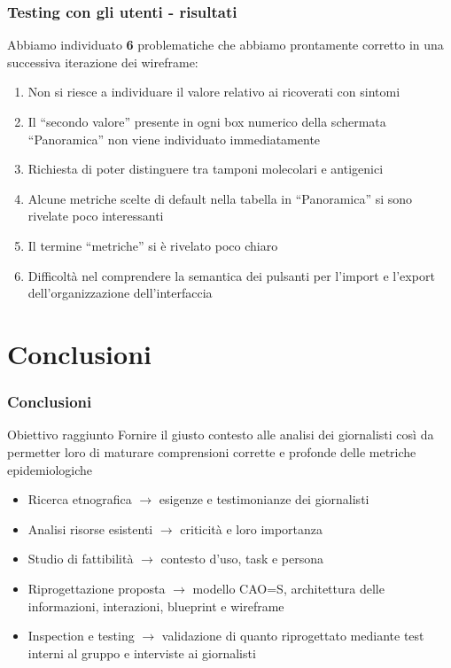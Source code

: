 \documentclass[handout]{beamer}
\begin{document}
		\begin{frame}
			\frametitle{Testing con gli utenti - risultati}
			Abbiamo individuato \textbf{6} problematiche che abbiamo prontamente corretto in una successiva iterazione dei wireframe:
			\begin{enumerate}[<+->]
				\item Non si riesce a individuare il valore relativo ai ricoverati con sintomi\\
				\item Il ``secondo valore'' presente in ogni box numerico della schermata ``Panoramica'' non viene individuato immediatamente\\
				\item Richiesta di poter distinguere tra tamponi molecolari e antigenici\\
				\item Alcune metriche scelte di default nella tabella in ``Panoramica'' si sono rivelate poco interessanti\\
				\item Il termine ``metriche'' si è rivelato poco chiaro\\
				\item Difficoltà nel comprendere la semantica dei pulsanti per l'import e l'export dell'organizzazione dell'interfaccia\\
			\end{enumerate}
		\end{frame}

	\section{Conclusioni}
		\begin{frame}
			\frametitle{Conclusioni}
			\begin{block}{Obiettivo raggiunto}
				Fornire il giusto contesto alle analisi dei giornalisti così da permetter loro di maturare comprensioni corrette e profonde delle metriche epidemiologiche
			\end{block}
			\begin{itemize}[<+->]
				\item Ricerca etnografica $\rightarrow$ esigenze e testimonianze dei giornalisti\\
				\item Analisi risorse esistenti $\rightarrow$ criticità e loro importanza\\
				\item Studio di fattibilità $\rightarrow$ contesto d'uso, task e persona\\
				\item Riprogettazione proposta $\rightarrow$ modello CAO=S, architettura delle informazioni, interazioni, blueprint e wireframe\\
				\item Inspection e testing $\rightarrow$ validazione di quanto riprogettato mediante test interni al gruppo e interviste ai giornalisti\\
			\end{itemize}
		\end{frame}
\end{document}
